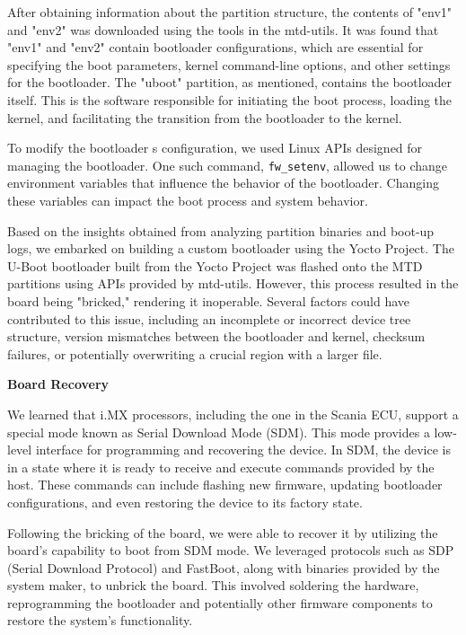 After obtaining information about the partition structure, the contents of "env1" and "env2" was downloaded using the tools in the mtd-utils. It was found that "env1" and "env2" contain bootloader configurations, which are essential for specifying the boot parameters, kernel command-line options, and other settings for the bootloader. The "uboot" partition, as mentioned, contains the bootloader itself. This is the software responsible for initiating the boot process, loading the kernel, and facilitating the transition from the bootloader to the kernel.

To modify the bootloader \textquotesingle s configuration, we used Linux APIs designed for managing the bootloader. One such command, \texttt{fw\_setenv}, allowed us to change environment variables that influence the behavior of the bootloader. Changing these variables can impact the boot process and system behavior.

Based on the insights obtained from analyzing partition binaries and boot-up logs, we embarked on building a custom bootloader using the Yocto Project. The U-Boot bootloader built from the Yocto Project was flashed onto the MTD partitions using APIs provided by mtd-utils. However, this process resulted in the board being "bricked," rendering it inoperable. Several factors could have contributed to this issue, including an incomplete or incorrect device tree structure, version mismatches between the bootloader and kernel, checksum failures, or potentially overwriting a crucial region with a larger file.

\textbf{Board Recovery}

We learned that i.MX processors, including the one in the Scania ECU, support a special mode known as Serial Download Mode (SDM). This mode provides a low-level interface for programming and recovering the device. In SDM, the device is in a state where it is ready to receive and execute commands provided by the host. These commands can include flashing new firmware, updating bootloader configurations, and even restoring the device to its factory state.

Following the bricking of the board, we were able to recover it by utilizing the board's capability to boot from SDM mode. We leveraged protocols such as SDP (Serial Download Protocol) and FastBoot, along with binaries provided by the system maker, to unbrick the board. This involved soldering the hardware, reprogramming the bootloader and potentially other firmware components to restore the system's functionality.

